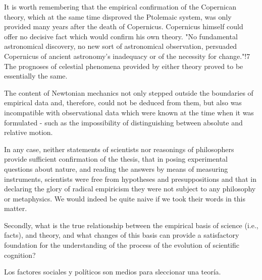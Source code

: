 It is worth remembering that the empirical confirmation of the Copernican theory, which at the same time disproved the Ptolemaic system,  was only provided many years after the death of Copernicus. Copernicus  himself could offer no decisive fact which would confirm his own theory.  "No fundamental astronomical discovery, no new sort of astronomical  observation, persuaded Copernicus of ancient astronomy's inadequacy or  of the necessity for change."!7 The prognoses of celestial phenomena  provided by either theory proved to be essentially the same.

The content of Newtonian mechanics not only stepped outside the  boundaries of empirical data and, therefore, could not be deduced from  them, but also was incompatible with observational data which were  known at the time when it was formulated - such as the impossibility of  distinguishing between absolute and relative motion.

In any case, neither statements of scientists nor  reasonings of philosophers provide sufficient confirmation of the thesis,  that in posing experimental questions about nature, and reading the  answers by means of measuring instruments, scientists were free from  hypotheses and presuppositions and that in declaring the glory of radical  empiricism they were not subject to any philosophy or metaphysics. We  would indeed be quite naive if we took their words in this matter.


Secondly, what is the true relationship between the empirical basis of  science (i.e., facts), and theory, and what changes of this basis can provide  a satisfactory foundation for the understanding of the process of the  evolution of scientific cognition?



Los factores sociales y políticos son medios para sleccionar una teoría.







